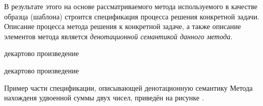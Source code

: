 В результате этого на основе рассматриваемого метода используемого в качестве образца (шаблона) строится спецификация процесса решения конкретной задачи. Описание процесса  метода решения к конкретной задаче, а также описание элементов метода является \textit{денотационной семантикой данного метода}.

\begin{SCn}
\begin{scnindent}
\end{scnindent}
\begin{scnindent}
    \begin{scnreltovector}{декартово произведение}
    \end{scnreltovector}
\end{scnindent}
\begin{scnindent}
    \begin{scnreltovector}{декартово произведение}
    \end{scnreltovector}
\end{scnindent}
\end{SCn}

Пример части спецификации, описывающей денотационную семантику Метода нахожденя удвоенной суммы двух чисел, приведён на рисунке .

